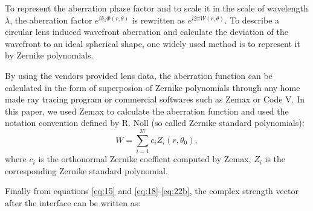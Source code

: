 \documentclass[9pt,twocolumn,twoside]{osajnl}
\begin{document}
To represent the aberration phase factor and to scale it in the scale of wavelength $\lambda$, the aberration factor $e^{ik_1\Phi(r,\theta)}$ is rewritten as $e^{i2\pi W(r,\theta)}$. To describe a circular lens induced wavefront aberration and calculate the deviation of the wavefront to an ideal spherical shape, one widely used method is to represent it by Zernike polynomials.  %

By using the vendors provided lens data, the aberration function can be calculated in the form of superposion of Zernike polynomials through any home made ray tracing program or commercial softwares such as Zemax or Code V. In this paper, we used Zemax to calculate the aberration function and used the notation convention defined by R. Noll \cite{Noll1976} (so called Zernike standard polynomials):
\begin{equation}\label{eq:22b}
	W = \sum_{i=1}^{37}c_iZ_i(r,\theta_0),
\end{equation}
where $c_i$ is the orthonormal Zernike coeffient computed by Zemax, $Z_i$ is the corresponding Zernike standard polynomial.

Finally from equations \eqref{eq:15} and \eqref{eq:18}-\eqref{eq:22b}, the complex strength vector after the interface can be written as:
\end{document}

